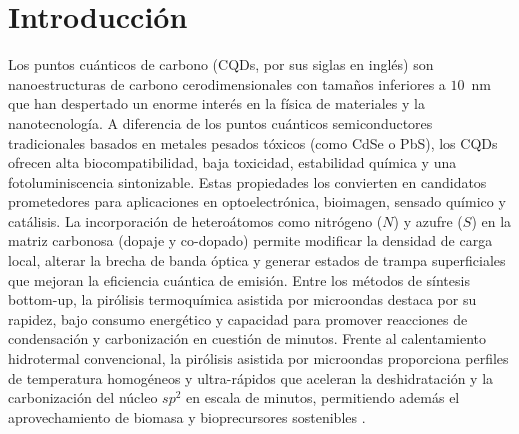 \section{Introducción}

Los puntos cuánticos de carbono (CQDs, por sus siglas en inglés) son nanoestructuras de carbono cerodimensionales con tamaños inferiores a $10$~nm que han despertado un enorme interés en la física de materiales y la nanotecnología. A diferencia de los puntos cuánticos semiconductores tradicionales basados en metales pesados tóxicos (como CdSe o PbS), los CQDs ofrecen alta biocompatibilidad, baja toxicidad, estabilidad química y una fotoluminiscencia sintonizable. Estas propiedades los convierten en candidatos prometedores para aplicaciones en optoelectrónica, bioimagen, sensado químico y catálisis.
La incorporación de heteroátomos como nitrógeno ($N$) y azufre ($S$) en la matriz carbonosa (dopaje y co-dopado) permite modificar la densidad de carga local, alterar la brecha de banda óptica y generar estados de trampa superficiales que mejoran la eficiencia cuántica de emisión. Entre los métodos de síntesis bottom-up, la pirólisis termoquímica asistida por microondas destaca por su rapidez, bajo consumo energético y capacidad para promover reacciones de condensación y carbonización en cuestión de minutos.
Frente al calentamiento hidrotermal convencional, la pirólisis asistida por microondas proporciona perfiles de temperatura homogéneos y ultra-rápidos que aceleran la deshidratación y la carbonización del núcleo $sp^2$ en escala de minutos, permitiendo además el aprovechamiento de biomasa y bioprecursores sostenibles \cite{ren2024carbon}.



